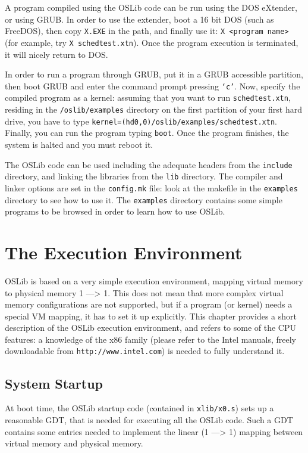 \documentclass[a4paper]{report}
\begin{document}
A program compiled using the OSLib code can be run using the DOS
eXtender, or using GRUB. In order to use the extender, boot  a 16 bit
DOS (such as FreeDOS), then copy {\tt X.EXE}
in the path, and finally use it: {\tt X <program name>} (for example,
try {\tt X schedtest.xtn}). Once the program execution is terminated,
it will nicely return to DOS.

In order to run a program through GRUB, put it in a GRUB accessible
partition, then boot GRUB and enter the command prompt pressing
{\tt `c'}. Now, specify the compiled program as a kernel: assuming
that you want to run {\tt schedtest.xtn}, residing in the
{\tt /oslib/examples} directory on the first partition of your first
hard drive, you have to type {\tt kernel=(hd0,0)/oslib/examples/schedtest.xtn}.
Finally, you can run the program typing {\tt boot}. Once the program
finishes, the system is halted and you must reboot it.

The OSLib code can be used including the adequate headers
from the {\tt include} directory, and linking the libraries from the
{\tt lib} directory. The compiler and linker options are set in the
{\tt config.mk} file: look at the makefile in the {\tt examples} directory
to see how to use it. The {\tt examples} directory contains
some simple programs to be browsed in order to learn how to use OSLib.

\chapter{The Execution Environment}
OSLib is based on a very simple execution environment, mapping virtual
memory to physical memory 1 ---> 1. This does not mean that more complex
virtual memory configurations are not supported, but if a program (or
kernel) needs a special VM mapping, it has to set it up explicitly.
This chapter provides a short description of the OSLib execution
environment, and refers to some of the CPU features: a knowledge of
the x86 family (please refer to the Intel manuals, freely downloadable
from {\tt http://www.intel.com}) is needed to fully understand it.

\section{System Startup}
At boot time, the OSLib startup code (contained in {\tt xlib/x0.s})
sets up a reasonable GDT, that is needed for executing all the OSLib
code. Such a GDT contains some entries needed to implement the linear
(1 ---> 1) mapping between virtual memory and physical memory.
\end{document}

